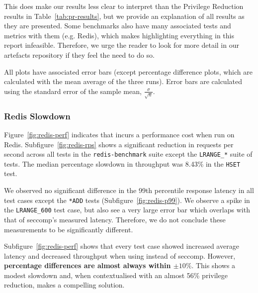 This does make our results less clear to interpret than the Privilege Reduction
results in Table~\ref{tab:pr-results}, but we provide an explanation of all
results as they are presented. Some benchmarks also have many associated tests
and metrics with them (e.g. Redis), which makes highlighting everything in this
report infeasible. Therefore, we urge the reader to look for more detail in our
artefacts repository if they feel the need to do so.

All plots have associated error bars (except percentage difference plots, which
are calculated with the mean average of the three runs). Error bars are
calculated using the standard error of the sample mean, 
$\frac{\sigma}{\sqrt n}$.

\subsubsection{Redis Slowdown}\label{subsubsec:redis-slowdown}

Figure~\ref{fig:redis-perf} indicates that \af incurs a performance cost when
run on Redis. Subfigure~\ref{fig:redis-rps} shows a significant reduction in
requests per second across all tests in the \texttt{redis-benchmark} suite
except the \texttt{LRANGE\_*} suite of tests. The median percentage slowdown in
throughput was 8.43\% in the \texttt{HSET} test.

We observed no significant difference in the 99th percentile response
latency in all test cases except the \texttt{*ADD} tests 
(Subfigure~\ref{fig:redis-p99}). We observe a spike in the \texttt{LRANGE\_600}
test case, but also see a very large error bar which overlaps with that of
seccomp's measured latency. Therefore, we do not conclude these measurements to
be significantly different.

Subfigure~\ref{fig:redis-perf} shows that every test case showed increased
average latency and decreased throughput when using \af instead of seccomp.
However, \textbf{percentage differences are almost always within $\pm 10\%$}.
This shows a modest slowdown and, when contextualised with an almost 56\%
privilege reduction, makes \af a compelling solution.

